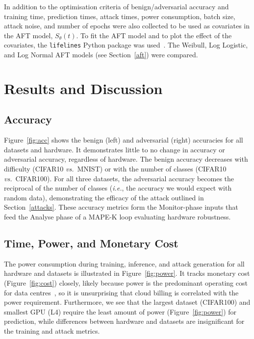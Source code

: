 \documentclass[conference]{IEEEtran}%
\begin{document}
In addition to the optimisation criteria of benign/adversarial accuracy and training time, prediction times, attack times, power consumption, batch size, attack noise, and number of epochs were also collected to be used as covariates in the AFT model, $S_{\theta}(t)$. 
To fit the AFT model and to plot the effect of the covariates, the \texttt{lifelines} Python package was used~\cite{lifelines}. 
The Weibull, Log Logistic, and Log Normal AFT models (see Section~\ref{aft}) were compared.


\section{Results and Discussion}
\label{results}

\subsection{Accuracy}
\label{res:acc}

Figure~\ref{fig:acc} shows the benign (left) and adversarial (right) accuracies for all datasets and hardware. 
It demonstrates little to no change in accuracy or adversarial accuracy, regardless of hardware. The benign accuracy decreases with difficulty (CIFAR10 \textit{vs.}~MNIST) or with the number of classes (CIFAR10 \textit{vs.}~CIFAR100). 
For all three datasets, the adversarial accuracy becomes the reciprocal of the number of classes (\textit{i.e.}, the accuracy we would expect with random data), demonstrating the efficacy of the attack outlined in Section~\ref{attacks}. 
These accuracy metrics form the Monitor-phase inputs that feed the Analyse phase of a MAPE-K loop evaluating hardware robustness.



\subsection{Time, Power, and Monetary Cost}
\label{res:cost}
The power consumption during training, inference, and attack generation for all hardware and datasets is illustrated in Figure~\ref{fig:power}. It tracks monetary cost (Figure~\ref{fig:cost}) closely, likely because power is the predominant operating cost for data centres~\cite{dayarathna2015data}, so it is unsurprising that cloud billing is correlated with the power requirement. Furthermore, we see that the largest dataset (CIFAR100) and smallest GPU (L4) require the least amount of power (Figure~\ref{fig:power}) for prediction, while differences between hardware and datasets are insignificant for the training and attack metrics.
\end{document}
